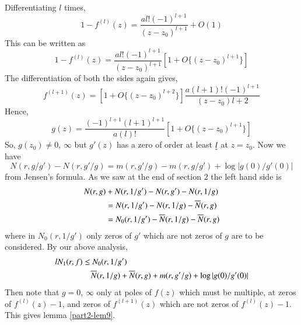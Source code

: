 Differentiating $l$ times,
$$
1-f^{(l)}(z)=\frac{al!(-1)^{l+1}}{(z-z_{0})^{l+1}}+O(1)
$$
This can be written as
$$
1-f^{(l)}(z)=\frac{al!(-1)^{l+1}}{(z-z_{0})^{l+1}}[1+O\{(z-z_{0})^{l+1}\}]
$$
The differentiation of both the sides again gives,
$$
f^{(l+1)}(z)=\left[1+O\{(z-z_{0})^{l+2}\}\right]\frac{a(l+1)!(-1)^{l+1}}{(z-z_{0})l+2}
$$
Hence,
$$
g(z)=\frac{(-1)^{l+1}(l+1)^{l+1}}{a(l)!}[1+O\{(z-z_{0})^{l+1}\}]
$$
So, $g(z_{0})\neq 0$, $\infty$ but $g'(z)$ has a zero of order at
least $\underline{l}$ at $z=z_{0}$. Now we have
$$
N(r,g/g')-N(r,g'/g)=m(r,g'/g)-m(r,g/g')+\log|g(0)/g'(0)|
$$\pageoriginale
from Jensen's formula. As we saw at the end of section $2$ the left
hand side is
\begin{align*}
N(r,g)&+N(r,1/g')-N(r,g')-N(r,1/g)\\ 
&= N(r,1/g')-N(r,1/g)-\overline{N}(r,g)\\
&= N_{0}(r,1/g')-\overline{N}(r,1/g)-\overline{N}(r,g)
\end{align*}
where in $N_{0}(r,1/g')$ only zeros of $g'$ which are not zeros of $g$
are to be considered. By our above analysis, 
\begin{align*}
lN_{1}(r,f) &\leq N_{0}(r,1/g')\\
&\quad \overline{N}(r,1/g)+\overline{N}(r,g)+m(r,g'/g)+\log|g(0)/g'(0)|
\end{align*}
Then note that $g=0$, $\infty$ only at poles of $f(z)$ which must be
multiple, at zeros of $f^{(l)}(z)-1$, and zeros of $f^{(l+1)}(z)$
which are not zeros of $f^{(l)}(z)-1$. This gives lemma
\ref{part2-lem9}.

